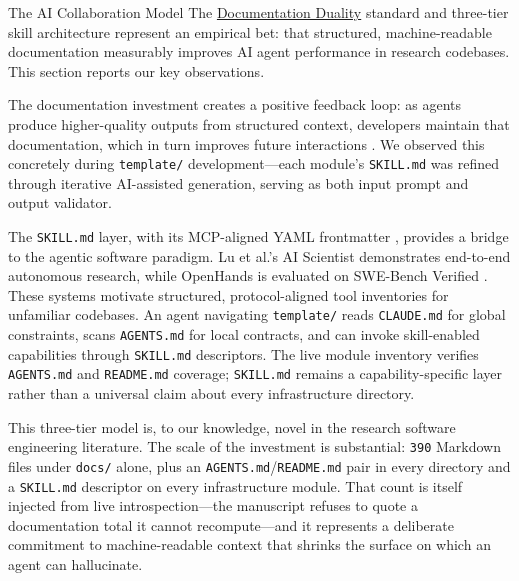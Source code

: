 \documentclass[
  ignorenonframetext,
]{beamer}
\author{\texorpdfstring{}{}}
\date{}
\begin{document}
\begin{frame}{The AI Collaboration Model}
\protect{}\label{the-ai-collaboration-model}
The
\href{03c_documentation.md\#documentation-duality-and-ai-collaboration}{Documentation
Duality} standard and three-tier skill architecture represent an
empirical bet: that structured, machine-readable documentation
measurably improves AI agent performance in research codebases. This
section reports our key observations.

The documentation investment creates a positive feedback loop: as agents
produce higher-quality outputs from structured context, developers
maintain that documentation, which in turn improves future interactions
. We observed this concretely during
\texttt{template/} development---each module's \texttt{SKILL.md} was
refined through iterative AI-assisted generation, serving as both input
prompt and output validator.

The \texttt{SKILL.md} layer, with its MCP-aligned YAML frontmatter
, provides a bridge to the agentic software
paradigm. Lu et al.'s AI Scientist \breakseq{[@lu2024aiscientist]} demonstrates
end-to-end autonomous research, while OpenHands is evaluated on
SWE-Bench Verified . These
systems motivate structured, protocol-aligned tool inventories for
unfamiliar codebases. An agent navigating \texttt{template/} reads
\texttt{CLAUDE.md} for global constraints, scans \texttt{AGENTS.md} for
local contracts, and can invoke skill-enabled capabilities through
\texttt{SKILL.md} descriptors. The live module inventory verifies
\texttt{AGENTS.md} and \texttt{README.md} coverage; \texttt{SKILL.md}
remains a capability-specific layer rather than a universal claim about
every infrastructure directory.

This three-tier model is, to our knowledge, novel in the research
software engineering literature. The scale of the investment is
substantial: \texttt{390} Markdown files under \texttt{docs/} alone,
plus an \texttt{AGENTS.md}/\texttt{README.md} pair in every directory
and a \texttt{SKILL.md} descriptor on every infrastructure module. That
count is itself injected from live introspection---the manuscript
refuses to quote a documentation total it cannot recompute---and it
represents a deliberate commitment to machine-readable context that
shrinks the surface on which an agent can hallucinate.
\end{frame}
\end{document}
